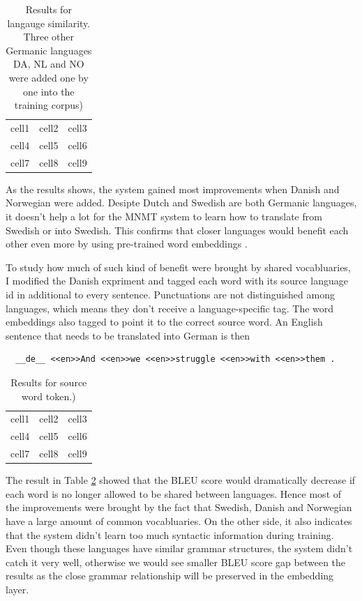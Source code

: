 \documentclass[thesis,fonts=libertine]{cluu}
\begin{document}
\begin{table}
  \centering
  \begin{tabular}{c c c}
    cell1 & cell2 & cell3 \\ 
    cell4 & cell5 & cell6 \\  
    cell7 & cell8 & cell9 
  \end{tabular}
  \caption{Results for langauge similarity. Three other Germanic languages DA, NL and NO were added one by one into the training corpus)}
  \label{table:language_similarity}
\end{table}

As the results shows, the system gained most improvements when Danish and Norwegian were added. Desipte Dutch and Swedish are both Germanic languages, it doesn't help a lot for the MNMT system to learn how to translate from Swedish or into Swedish. This confirms that closer languages would benefit each other even more by using pre-trained word embeddings \parencite{Qi:2018aa}.

To study how much of such kind of benefit were brought by shared vocabluaries, I modified the Danish expriment and tagged each word with its source language id in additional to every sentence. Punctuations are not distinguished among languages, which means they don't receive a language-specific tag. The word embeddings also tagged to point it to the correct source word. An English sentence that needs to be translated into German is then 

\begin{verbatim}
  __de__ <<en>>And <<en>>we <<en>>struggle <<en>>with <<en>>them .
\end{verbatim}

\begin{table}
  \centering
  \begin{tabular}{c c c}
    cell1 & cell2 & cell3 \\ 
    cell4 & cell5 & cell6 \\  
    cell7 & cell8 & cell9 
  \end{tabular}
  \caption{Results for source word token.)}
  \label{table:word_token}
\end{table}

The result in Table \ref{table:word_token} showed that the BLEU score would dramatically decrease if each word is no longer allowed to be shared between languages. Hence most of the improvements were brought by the fact that Swedish, Danish and Norwegian have a large amount of common vocabluaries. On the other side, it also indicates that the system didn't learn too much syntactic information during training. Even though these languages have similar grammar structures, the system didn't catch it very well, otherwise we would see smaller BLEU score gap between the results as the close grammar relationship will be preserved in the embedding layer.
\end{document}
